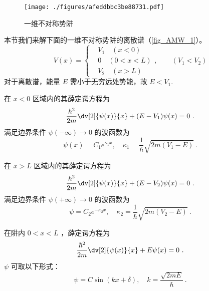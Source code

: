 
\begin{issues}
\issueTODO
{}
\end{issues}

\begin{figure}[ht]
\centering
\texttt{[image: ./figures/afeddbbc3be88731.pdf]}
\caption{一维不对称势阱} \label{fig_AMW_1}
\end{figure}
本节我们来解下面的一维不对称势阱的离散谱（\autoref{fig_AMW_1}）。
\begin{equation}
V(x)=\left\{\begin{aligned}
&V_1\quad(x<0)\\
&0\quad (0<x<L)\\
&V_2\quad(x>L)
\end{aligned}\right.
,\qquad (V_1 < V_2)
\end{equation}
对于离散谱，能量 $E$ 需小于无穷远处势能，故 $E<V_1$. 

在 $x<0$ 区域内的其薛定谔方程为
\begin{equation}
\frac{\hbar^2}{2m}\dv[2]{\psi(x)}{x}+(E-V_1)\psi(x)=0~.
\end{equation}
满足边界条件 $\psi(-\infty)\to 0$ 的波函数为
\begin{equation}
\psi(x)=C_1 e^{\kappa_1 x},\quad \kappa_1=\frac{1}{\hbar}\sqrt{2m(V_1-E)}~.
\end{equation}

在 $x>L$ 区域内的其薛定谔方程为
\begin{equation}
\frac{\hbar^2}{2m}\dv[2]{\psi(x)}{x}+(E-V_2)\psi(x)=0~.
\end{equation}
满足边界条件 $\psi(+\infty)\to 0$ 的波函数为
\begin{equation}
\psi=C_2 e^{-\kappa_2 x},\quad \kappa_2=\frac{1}{\hbar}\sqrt{2m(V_2-E)}~.
\end{equation}

在阱内 $0 < x < L$ ，薛定谔方程为
\begin{equation}
\frac{\hbar^2}{2m}\dv[2]{\psi(x)}{x}+E\psi(x)=0~.
\end{equation}
$\psi$ 可取以下形式：
\begin{equation}
\psi=C\sin(kx+\delta),\quad k=\frac{\sqrt{2mE}}{\hbar}~.
\end{equation}

